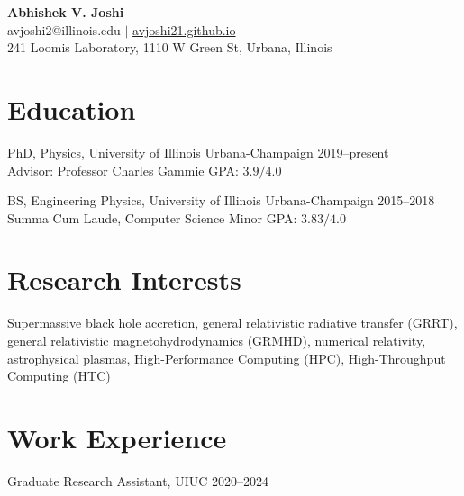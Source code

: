 \documentclass[11pt]{article}
\begin{document}
\begin{center}
{\Large \bfseries Abhishek V. Joshi}\\\vspace{0.5em}
avjoshi2@illinois.edu $|$ \href{https://avjoshi21.github.io}{avjoshi21.github.io} \\\vspace{0.25em} 241 Loomis Laboratory, 1110 W Green St, Urbana, Illinois
\end{center}

\section*{Education}
PhD, Physics, University of Illinois Urbana-Champaign \hfill 2019--present\\
Advisor: Professor Charles Gammie  \hfill {\normalsize GPA: $3.9/4.0$}


BS, Engineering Physics, University of Illinois Urbana-Champaign \hfill 2015--2018\\
{\normalsize Summa Cum Laude, Computer Science Minor} {\hfill GPA: $3.83/4.0$}


\section*{Research Interests}
Supermassive black hole accretion, general relativistic radiative transfer (GRRT), general relativistic magnetohydrodynamics (GRMHD), numerical relativity, astrophysical plasmas, High-Performance Computing (HPC), High-Throughput Computing (HTC)   

\section*{Work Experience}
Graduate Research Assistant, UIUC \hfill 2020--2024
\end{document}
